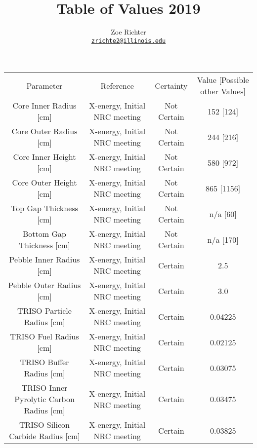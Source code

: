\documentclass[letterpaper]{article}
\author{Zoe Richter
        \\ \href{mailto:zrichte2@illinois.edu}{\texttt{zrichte2@illinois.edu}}
}
\title{Table of Values 2019}
\begin{document}
\maketitle



\begin{adjustbox}{max width=\textwidth}
\centering
 \begin{tabular}{c c c c}
 Parameter & Reference & Certainty & Value [Possible other Values] \\

 Core Inner Radius [cm] & X-energy, Initial NRC meeting & Not Certain & 152 [124] \\

 Core Outer Radius [cm] & X-energy, Initial NRC meeting & Not Certain & 244 [216] \\

 Core Inner Height [cm] & X-energy, Initial NRC meeting & Not Certain & 580 [972] \\

 Core Outer Height [cm] & X-energy, Initial NRC meeting & Not Certain & 865 [1156] \\

 Top Gap Thickness [cm] & X-energy, Initial NRC meeting & Not Certain & n/a [60] \\

 Bottom Gap Thickness [cm] & X-energy, Initial NRC meeting & Not Certain & n/a [170] \\

 Pebble Inner Radius [cm] & X-energy, Initial NRC meeting & Certain & 2.5 \\

 Pebble Outer Radius [cm] & X-energy, Initial NRC meeting & Certain & 3.0 \\

 TRISO Particle Radius [cm] & X-energy, Initial NRC meeting & Certain & 0.04225 \\

 TRISO Fuel Radius [cm] & X-energy, Initial NRC meeting & Certain & 0.02125 \\

 TRISO Buffer Radius [cm] & X-energy, Initial NRC meeting & Certain & 0.03075 \\

 TRISO Inner Pyrolytic Carbon Radius [cm] & X-energy, Initial NRC meeting & Certain & 0.03475 \\

 TRISO Silicon Carbide Radius [cm] & X-energy, Initial NRC meeting & Certain & 0.03825 \\


\end{tabular}
\end{adjustbox}
\end{document}
